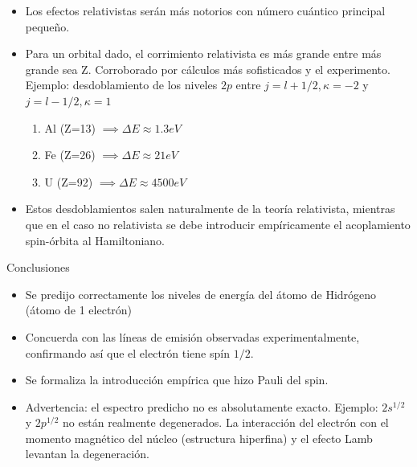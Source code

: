 \documentclass{beamer}
\begin{document}
\begin{frame}
 \begin{itemize}
  \item Los efectos relativistas ser\'an m\'as notorios con n\'umero cu\'antico principal peque\~no.
    \vspace{3mm}
  \item Para un orbital dado, el corrimiento relativista es m\'as grande entre m\'as grande sea Z. Corroborado por c\'alculos m\'as sofisticados y el experimento. \\
  Ejemplo: desdoblamiento de los niveles $2p$ entre $j=l+1/2, \kappa = -2$ y $j=l-1/2, \kappa = 1$
  \begin{enumerate}
   \item Al (Z=13) $\implies \Delta E \approx 1.3 eV$
   \item Fe (Z=26) $\implies \Delta E \approx 21 eV$
   \item U (Z=92) $\implies \Delta E \approx 4500 eV$
  \end{enumerate}
  \vspace{3mm}
  \item Estos desdoblamientos salen naturalmente de la teor\'ia relativista, mientras que en el caso no relativista se debe introducir emp\'iricamente el acoplamiento spin-\'orbita al Hamiltoniano.

 
  \end{itemize}

\end{frame}

\begin{frame}{Conclusiones}

\begin{itemize}
 \item  Se predijo correctamente los niveles de energ\'ia del \'atomo de Hidr\'ogeno (\'atomo de 1 electr\'on)
  \vspace{1mm}
 \item Concuerda con las l\'ineas de emisi\'on observadas experimentalmente, confirmando as\'i que el electr\'on tiene sp\'in $1/2$.
 \vspace{1mm}
 \item Se formaliza la introducci\'on emp\'irica que hizo Pauli del spin.
 \vspace{1mm}
 \item Advertencia: el espectro predicho no es absolutamente exacto. Ejemplo: $2s^{1/2}  $ y $2p^{1/2}$ no est\'an realmente degenerados. La interacci\'on del electr\'on con el momento magn\'etico del n\'ucleo (estructura hiperfina) y el efecto Lamb levantan la degeneraci\'on.
\end{itemize}

\end{frame}
\end{document}
